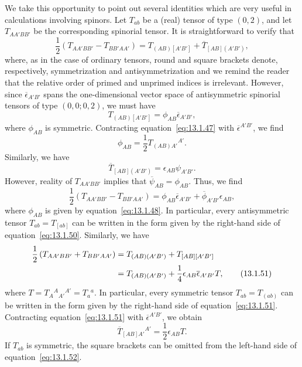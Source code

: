 We take this opportunity to point out several identities which are very useful in
calculations involving spinors. Let \(T_{ab}\) be a (real) tensor of type \((0,2)\),
and let \(T_{AA'BB'}\) be the corresponding spinorial tensor. It is straightforward
to verify that
\begin{equation}
  \frac12\left(T_{AA'BB'}-T_{BB'AA'}\right)
  =T_{(AB)[A'B']}+\overline T_{[AB](A'B')},
  \tag{13.1.46}\label{eq:13.1.46}
\end{equation}
where, as in the case of ordinary tensors, round and square brackets denote,
respectively, symmetrization and antisymmetrization and we remind the reader that the
relative order of primed and unprimed indices is irrelevant. However, since
\(\overline\epsilon_{A'B'}\) spans the one-dimensional vector space of
antisymmetric spinorial tensors of type \((0,0;0,2)\), we must have
\begin{equation}
  T_{(AB)[A'B']}=\phi_{AB}\overline\epsilon_{A'B'},
  \tag{13.1.47}\label{eq:13.1.47}
\end{equation}
where \(\phi_{AB}\) is symmetric. Contracting equation~\eqref{eq:13.1.47} with
\(\overline\epsilon^{A'B'}\), we find
\begin{equation}
  \phi_{AB}=\frac12T_{(AB)A'}{}^{A'}.
  \tag{13.1.48}\label{eq:13.1.48}
\end{equation}
Similarly, we have
\begin{equation}
  \overline T_{[AB](A'B')}=\epsilon_{AB}\psi_{A'B'}.
  \tag{13.1.49}\label{eq:13.1.49}
\end{equation}
However, reality of \(T_{AA'BB'}\) implies that
\(\overline\psi_{AB}=\phi_{AB}\). Thus, we find
\begin{equation}
  \frac12\left(T_{AA'BB'}-T_{BB'AA'}\right)
  =\phi_{AB}\overline\epsilon_{A'B'}+
   \overline\phi_{A'B'}\epsilon_{AB},
  \tag{13.1.50}\label{eq:13.1.50}
\end{equation}
where \(\phi_{AB}\) is given by equation~\eqref{eq:13.1.48}. In particular, every
antisymmetric tensor \(T_{ab}=T_{[ab]}\) can be written in the form given by the
right-hand side of equation~\eqref{eq:13.1.50}. Similarly, we have
\begin{align}
  \frac12\left(T_{AA'BB'}+T_{BB'AA'}\right)
    &=T_{(AB)(A'B')}+T_{[AB][A'B']}\notag\\
    &=T_{(AB)(A'B')}+\frac14\epsilon_{AB}\overline\epsilon_{A'B'}T,
  \tag{13.1.51}\label{eq:13.1.51}
\end{align}
where \(T=T_A{}^A{}_{A'}{}^{A'}=T_a{}^a\). In particular, every symmetric tensor
\(T_{ab}=T_{(ab)}\) can be written in the form given by the right-hand side of
equation~\eqref{eq:13.1.51}. Contracting equation~\eqref{eq:13.1.51} with
\(\overline\epsilon^{A'B'}\), we obtain
\begin{equation}
  \overline T_{[AB]A'}{}^{A'}=\frac12\epsilon_{AB}T.
  \tag{13.1.52}\label{eq:13.1.52}
\end{equation}
If \(T_{ab}\) is symmetric, the square brackets can be omitted from the left-hand
side of equation~\eqref{eq:13.1.52}.

